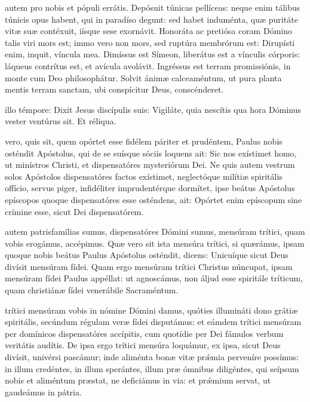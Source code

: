 \documentclass[fontsize=9pt,paper=A6,twoside,BCOR=1mm,DIV=22,headinclude]{scrarticle}
\begin{document}
\begin{multicols}{2}
{\RVCPv 

 autem pro nobis et pópuli errátis. Depósuit túnicas pellíceas: neque enim tálibus túnicis opus habent, qui in paradíso degunt: sed habet induménta, quæ puritáte vitæ suæ contéxuit, iísque sese exornávit. Honoráta ac pretiósa coram Dómino talis viri mors est; immo vero non mors, sed ruptúra membrórum est: Dirupísti enim, inquit, víncula mea. Dimíssus est Símeon, liberátus est a vínculis córporis: láqueus contrítus est, et avícula avolávit. Ingréssus est terram promissiónis, in monte cum Deo philosophátur. Solvit ánimæ calceaméntum, ut pura planta mentis terram sanctam, ubi conspícitur Deus, conscénderet.

\RVCPvi 

 illo témpore: Dixit Jesus discípulis suis: Vigiláte, quia nescítis qua hora Dóminus vester ventúrus sit. Et réliqua.

}

{
 vero, quis sit, quem opórtet esse fidélem páriter et prudéntem, Paulus nobis osténdit Apóstolus, qui de se suísque sóciis loquens ait: Sic nos exístimet homo, ut minístros Christi, et dispensatóres mysteriórum Dei. Ne quis autem vestrum solos Apóstolos dispensatóres factos exístimet, neglectóque milítiæ spiritális offício, servus piger, infidéliter imprudentérque dormítet, ipse beátus Apóstolus epíscopos quoque dispensatóres esse osténdens, ait: Opórtet enim epíscopum sine crímine esse, sicut Dei dispensatórem.

\RVCPvii 

 autem patrisfamílias sumus, dispensatóres Dómini sumus, mensúram trítici, quam vobis erogámus, accépimus. Quæ vero sit ista mensúra trítici, si quærámus, ipsam quoque nobis beátus Paulus Apóstolus osténdit, dicens:
Unicuíque sicut Deus divísit mensúram fídei. Quam ergo mensúram trítici Christus núncupat, ipsam mensúram fídei Paulus appéllat: ut agnoscámus, non áljud esse spiritále tríticum, quam christiánæ fídei venerábile Sacraméntum.

\RVCPviii 

 trítici mensúram vobis in nómine Dómini damus, quóties illumináti dono grátiæ spiritális, secúndum régulam veræ fídei disputámus: et eámdem trítici mensúram per domínicos dispensatóres accípitis, cum quotídie per Dei fámulos verbum veritátis audítis. De ipsa ergo trítici mensúra loquámur, ex ipsa, sicut Deus divísit, univérsi pascámur; inde aliménta bonæ vitæ pr\'æmia perveníre possímus: in illum credéntes, in illum sperántes, illum præ ómnibus diligéntes, qui seípsum nobis et aliméntum præstat, ne deficiámus in via: et pr\'æmium servat, ut gaudeámus in pátria.

}
\end{multicols}
\end{document}
